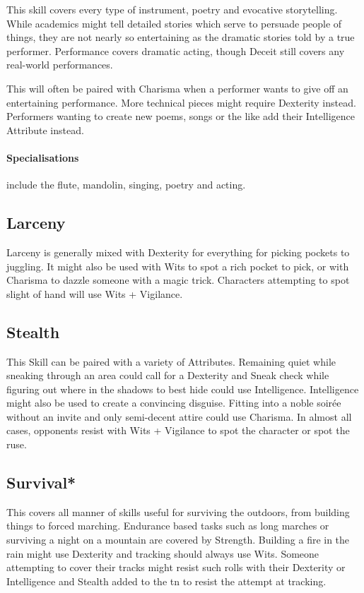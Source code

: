 \begin{multicols}{2}
This skill covers every type of instrument, poetry and evocative storytelling. While academics might tell detailed stories which serve to persuade people of things, they are not nearly so entertaining as the dramatic stories told by a true performer. Performance covers dramatic acting, though Deceit still covers any real-world performances.

This will often be paired with Charisma when a performer wants to give off an entertaining performance. More technical pieces might require Dexterity instead. Performers wanting to create new poems, songs or the like add their Intelligence Attribute instead.

\paragraph{Specialisations} include the flute, mandolin, singing, poetry and acting.

\subsection{Larceny}

Larceny is generally mixed with Dexterity for everything for picking pockets to juggling.
It might also be used with Wits to spot a rich pocket to pick, or with Charisma to dazzle someone with a magic trick.
Characters attempting to spot slight of hand will use Wits + Vigilance.

\subsection{Stealth}

This Skill can be paired with a variety of Attributes.
Remaining quiet while sneaking through an area could call for a Dexterity and Sneak check while figuring out where in the shadows to best hide could use Intelligence.
Intelligence might also be used to create a convincing disguise.
Fitting into a noble soir\'{e}e without an invite and only semi-decent attire could use Charisma.
In almost all cases, opponents resist with Wits + Vigilance to spot the character or spot the ruse.

\subsection{Survival*}

This covers all manner of skills useful for surviving the outdoors, from building things to forced marching. Endurance based tasks such as long marches or surviving a night on a mountain are covered by Strength. Building a fire in the rain might use Dexterity and tracking should always use Wits. Someone attempting to cover their tracks might resist such rolls with their Dexterity or Intelligence and Stealth added to the \gls{tn} to resist the attempt at tracking.


\end{multicols}
